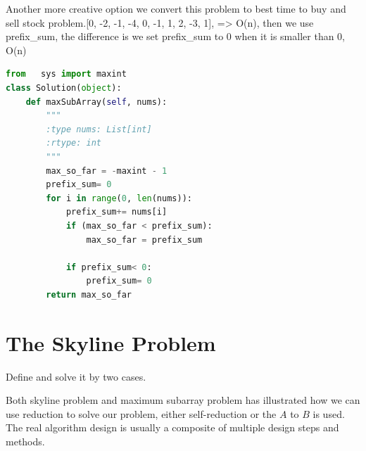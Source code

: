 \documentclass[../main.tex]{subfiles}
\begin{document}
Another more creative option we convert this problem to best time to buy and sell stock problem.[0, -2, -1, -4, 0, -1, 1, 2, -3, 1], => O(n), then we use prefix\_sum, the difference is we set prefix\_sum to 0 when it is smaller than 0, O(n)
\begin{lstlisting}[language = Python]
from   sys import maxint
class Solution(object):    
    def maxSubArray(self, nums):
        """
        :type nums: List[int]
        :rtype: int
        """
        max_so_far = -maxint - 1
        prefix_sum= 0
        for i in range(0, len(nums)):
            prefix_sum+= nums[i]
            if (max_so_far < prefix_sum):
                max_so_far = prefix_sum
 
            if prefix_sum< 0:
                prefix_sum= 0  
        return max_so_far
\end{lstlisting}













 
 






\section{The Skyline Problem}
Define and solve it by two cases.

Both skyline problem and maximum subarray problem has illustrated how we can use reduction to solve our problem, either self-reduction or the $A$ to $B$ is used. The real algorithm design is usually a  composite of multiple design steps and methods. 
 
\end{document}
